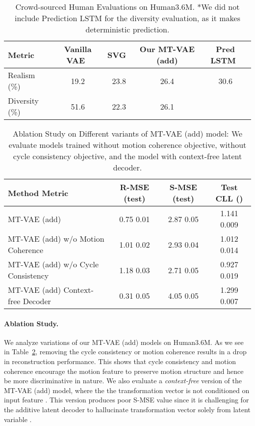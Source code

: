 \documentclass[runningheads]{llncs}
\begin{document}
\begin{table}[t]
\small
\caption{
Crowd-sourced Human Evaluations on Human3.6M. *We did not include Prediction LSTM for the diversity evaluation, as it makes deterministic prediction.
}
\centering
\begin{tabular}{l||c|c|c||c}
\hline
Metric  & Vanilla VAE~\cite{mohammad2018stochastic} & SVG~\cite{denton2018stochastic} & Our MT-VAE (add) & Pred LSTM~\cite{villegas2017learning}\\
\hline
Realism (\%)  & 19.2 & 23.8 & 26.4 & 30.6\\
\hline
Diversity (\%)  & 51.6 & 22.3 & 26.1 & \\
\hline
\end{tabular}
\label{tab:table_h36m_AMT}
\vspace*{-0.1in}
\end{table}

\begin{table}[t]
\small
\caption{
Ablation Study on Different variants of MT-VAE (add) model: We evaluate models trained without motion coherence objective, without cycle consistency objective, and the model with context-free latent decoder.
}
\centering
\begin{tabular}{l||c|c|c}
\hline
{Method  Metric} & {R-MSE (test) } & {S-MSE (test) } & {Test CLL  ()}\\
\hline
MT-VAE (add) & 0.75  0.01 & 2.87  0.05 & 1.141  0.009\\
\hline
MT-VAE (add) w/o Motion Coherence & 1.01  0.02 & 2.93  0.04 & 1.012  0.014\\
\hline
MT-VAE (add) w/o Cycle Consistency & 1.18  0.03 & 2.71  0.05 & 0.927  0.019\\
\hline 
MT-VAE (add) Context-free Decoder & 0.31  0.05 & 4.05  0.05 & 1.299  0.007\\
\hline
\end{tabular}
\label{tab:table_h36m_ablation}
\vspace*{-0.1in}
\end{table}

\paragraph{Ablation Study.}
\vspace*{-0.1in}

We analyze variations of our MT-VAE (add) models on Human3.6M.
As we see in Table~\ref{tab:table_h36m_ablation}, removing the cycle consistency or motion coherence  results in a drop in reconstruction performance.
This shows that cycle consistency and motion coherence encourage the motion feature to preserve motion structure and hence be more discriminative in nature.
We also evaluate a \textit{context-free} version of the MT-VAE (add) model, where the the transformation vector  is not conditioned on input feature . This version  produces poor S-MSE value since it is challenging for the additive latent decoder to hallucinate transformation vector  solely from latent variable .
\end{document}
